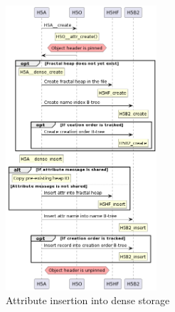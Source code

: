 \begin{figure}
    \centering
    \includegraphics[width=0.5\textwidth]{images/tour_3_uml_attr_create_dense.png}
    \caption{Attribute insertion into dense storage}
    \label{fig:tour-3-uml-attr-create-dense}
\end{figure}

